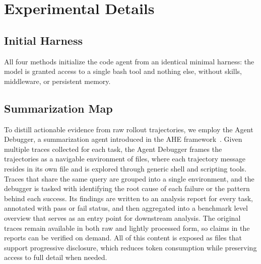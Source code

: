 \documentclass{article}
\begin{document}




\newpage
\appendix
\section{Experimental Details}
\label{sec:appendix_experiment_details}


\subsection{Initial Harness}
All four methods initialize the code agent from an identical minimal harness: the model is granted access to a single bash tool and nothing else, without skills, middleware, or persistent memory.

\subsection{Summarization Map}
To distill actionable evidence from raw rollout trajectories, we employ the Agent Debugger, a summarization agent introduced in the AHE framework~\citep{lin2026agentic}. Given multiple traces collected for each task, the Agent Debugger frames the trajectories as a navigable environment of files, where each trajectory message resides in its own file and is explored through generic shell and scripting tools. Traces that share the same query are grouped into a single environment, and the debugger is tasked with identifying the root cause of each failure or the pattern behind each success. Its findings are written to an analysis report for every task, annotated with pass or fail status, and then aggregated into a benchmark level overview that serves as an entry point for downstream analysis. The original traces remain available in both raw and lightly processed form, so claims in the reports can be verified on demand. All of this content is exposed as files that support progressive disclosure, which reduces token consumption while preserving access to full detail when needed.
\end{document}
